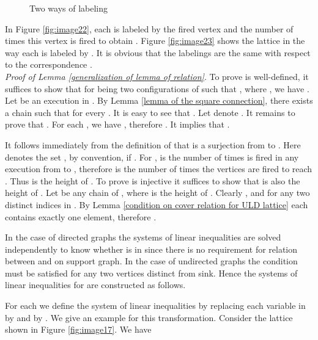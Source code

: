 \documentclass{article}
\theoremstyle{definition}
\begin{document}
\captionsetup[subfloat]{justification=centerfirst,singlelinecheck=false}
\begin{figure}[!h]
\centering
{}
\qquad \qquad
{}
\caption{Two ways of labeling}
\end{figure}
\captionsetup[subfloat]{justification=justified,singlelinecheck=true}In Figure \ref{fig:image22}, each  is labeled by the fired vertex and the number of times this vertex is fired to obtain . Figure \ref{fig:image23} shows the lattice in the way each  is labeled by . It is obvious that the labelings are the same with respect to the correspondence .\\

\noindent\emph{{Proof of Lemma \ref{generalization of lemma of relation}}}. To prove  is well-defined, it suffices to show that for  being two configurations of  such that , where , we have  \linebreak . Let  be an execution in . By Lemma \ref{lemma of the square connection}, there exists a chain  such that  for every . It is easy to see that . Let  denote . It remains to prove that . For each , we have , therefore . It implies that .
 

It follows immediately from the definition of  that  is a surjection from  to . Here  denotes the set , by convention,  if . For ,  is the number of times  is fired in any execution from  to , therefore  is the number of times the vertices are fired to reach . Thus  is the height of . To prove  is injective it suffices to show that  is also the height of . Let   be any chain of , where  is the height of . Clearly , and  for any two distinct indices  in . By Lemma \ref{condition on cover relation for ULD lattice} each  contains exactly one element, therefore .\hfill 

In the case of directed graphs the systems  of linear inequalities are solved independently to know whether  is in  since there is no requirement for relation between  and  on support graph. In the case of undirected graphs the condition  must be satisfied for any two vertices distinct from sink. Hence the systems of linear inequalities for  are constructed as follows.

For each  we define the system of linear inequalities  by replacing each variable  in  by  and  by . We give an example for this transformation. Consider the lattice shown in Figure \ref{fig:image17}. We have 
\end{document}
